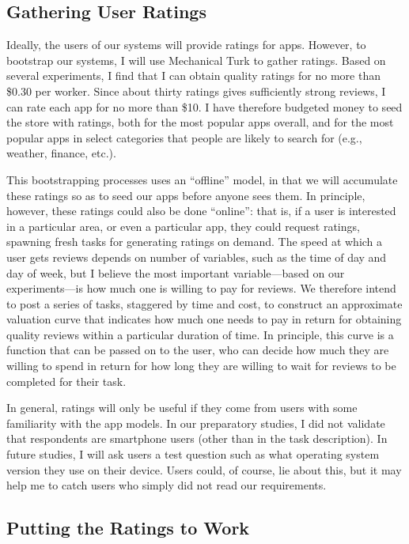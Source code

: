 \documentclass[11pt]{article}
\begin{document}
\subsection{Gathering User Ratings}
\label{subsec-gather-ratings}

Ideally, the users of our systems will provide ratings for
apps. However, 
to bootstrap our systems, I will use Mechanical Turk to gather
ratings. Based on several experiments, I find that I can obtain
quality ratings for no more than \$0.30 per worker. Since about thirty
ratings gives sufficiently strong reviews, I can rate each
app for no more than \$10. 
I have therefore budgeted money to
seed the store with ratings, both for the most popular apps overall,
and for the most popular apps in select categories that people are
likely to search for (e.g., weather, finance, etc.).

This bootstrapping processes uses an ``offline'' model, in that we
will accumulate these ratings so as to seed our apps before anyone
sees them. In principle, however, these ratings could also be done
``online'': that is, if a user is interested in a particular area, or
even a particular app, they could request ratings, spawning fresh tasks for
generating ratings on demand. The speed at which a user gets reviews
depends on number of variables, such as the time of day and day of
week, but I believe the most important variable---based on our
experiments---is how much one is willing to pay for reviews. We
therefore intend to post a series of tasks, staggered by time and
cost, to construct an approximate valuation curve that indicates how
much one needs to pay in return for obtaining quality reviews within a
particular duration of time. In principle, this curve is a function
that can be passed on to the user, who can decide how much they are
willing to spend in return for how long they are willing to wait for
reviews to be completed for their task.

In general, ratings will only be useful if they come from users with some
familiarity with the app models.
In our preparatory studies, I did not validate that respondents are
smartphone users (other than in the task description). In future
studies, I will ask users a test question such as what operating
system version they use on their device. Users could, of course, lie
about this, but it may help me to catch users who simply did not read
our requirements.

\subsection{Putting the Ratings to Work}
\label{subsec-app-selection}
\end{document}
